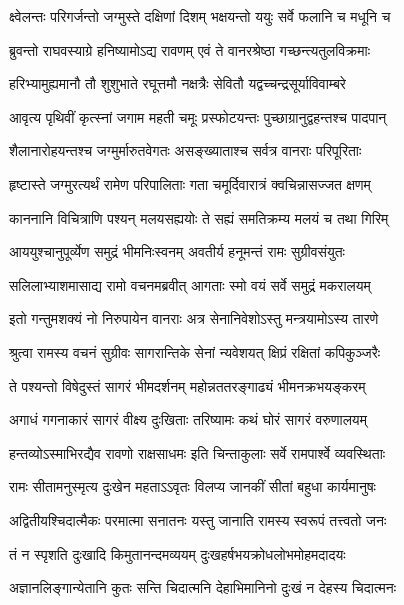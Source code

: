 \twolineshloka
{क्ष्वेलन्तः परिगर्जन्तो जग्मुस्ते दक्षिणां दिशम्}
{भक्षयन्तो ययुः सर्वे फलानि च मधूनि च} %

\twolineshloka
{ब्रुवन्तो राघवस्याग्रे हनिष्यामोऽद्य रावणम्}
{एवं ते वानरश्रेष्ठा गच्छन्त्यतुलविक्रमाः} %

\twolineshloka
{हरिभ्यामुह्यमानौ तौ शुशुभाते रघूत्तमौ}
{नक्षत्रैः सेवितौ यद्वच्चन्द्रसूर्याविवाम्बरे} %

\twolineshloka
{आवृत्य पृथिवीं कृत्स्नां जगाम महती चमूः}
{प्रस्फोटयन्तः पुच्छाग्रानुद्वहन्तश्च पादपान्} %

\twolineshloka
{शैलानारोहयन्तश्च जग्मुर्मारुतवेगतः}
{असङ्ख्याताश्च सर्वत्र वानराः परिपूरिताः} %

\twolineshloka
{हृष्टास्ते जग्मुरत्यर्थं रामेण परिपालिताः}
{गता चमूर्दिवारात्रं क्वचिन्नासज्जत क्षणम्} %

\twolineshloka
{काननानि विचित्राणि पश्यन् मलयसह्ययोः}
{ते सह्यं समतिक्रम्य मलयं च तथा गिरिम्} %

\twolineshloka
{आययुश्चानुपूर्व्येण समुद्रं भीमनिःस्वनम्}
{अवतीर्य हनूमन्तं रामः सुग्रीवसंयुतः} %

\twolineshloka
{सलिलाभ्याशमासाद्य रामो वचनमब्रवीत्}
{आगताः स्मो वयं सर्वे समुद्रं मकरालयम्} %

\twolineshloka
{इतो गन्तुमशक्यं नो निरुपायेन वानराः}
{अत्र सेनानिवेशोऽस्तु मन्त्रयामोऽस्य तारणे} %

\twolineshloka
{श्रुत्वा रामस्य वचनं सुग्रीवः सागरान्तिके}
{सेनां न्यवेशयत् क्षिप्रं रक्षितां कपिकुञ्जरैः} %

\twolineshloka
{ते पश्यन्तो विषेदुस्तं सागरं भीमदर्शनम्}
{महोन्नततरङ्गाढ्यं भीमनक्रभयङ्करम्} %

\twolineshloka
{अगाधं गगनाकारं सागरं वीक्ष्य दुःखिताः}
{तरिष्यामः कथं घोरं सागरं वरुणालयम्} %

\twolineshloka
{हन्तव्योऽस्माभिरद्यैव रावणो राक्षसाधमः}
{इति चिन्ताकुलाः सर्वे रामपार्श्वे व्यवस्थिताः} %

\twolineshloka
{रामः सीतामनुस्मृत्य दुःखेन महताऽऽवृतः}
{विलप्य जानकीं सीतां बहुधा कार्यमानुषः} %

\twolineshloka
{अद्वितीयश्चिदात्मैकः परमात्मा सनातनः}
{यस्तु जानाति रामस्य स्वरूपं तत्त्वतो जनः} %

\twolineshloka
{तं न स्पृशति दुःखादि किमुतानन्दमव्ययम्}
{दुःखहर्षभयक्रोधलोभमोहमदादयः} %

\twolineshloka
{अज्ञानलिङ्गान्येतानि कुतः सन्ति चिदात्मनि}
{देहाभिमानिनो दुःखं न देहस्य चिदात्मनः} %

